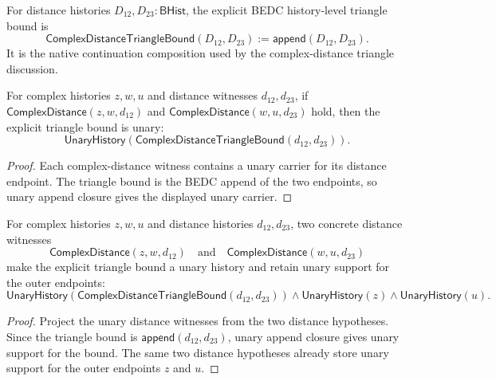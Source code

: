 \begin{definition}
\label{def:complex-distance-triangle-bound}
For distance histories $D_{12},D_{23}:\mathsf{BHist}$, the explicit BEDC
history-level triangle bound is
$$
\mathsf{ComplexDistanceTriangleBound}(D_{12},D_{23})
:=
\mathsf{append}(D_{12},D_{23}).
$$
It is the native continuation composition used by the complex-distance
triangle discussion.
\end{definition}

\begin{theorem}
\label{thm:complex-distance-triangle-bound-unary}
For complex histories $z,w,u$ and distance witnesses $d_{12},d_{23}$,
if $\mathsf{ComplexDistance}(z,w,d_{12})$ and
$\mathsf{ComplexDistance}(w,u,d_{23})$ hold, then the explicit triangle
bound is unary:
$$
\mathsf{UnaryHistory}
  (\mathsf{ComplexDistanceTriangleBound}(d_{12},d_{23})).
$$
\end{theorem}
\begin{proof}
Each complex-distance witness contains a unary carrier for its distance
endpoint. The triangle bound is the BEDC append of the two endpoints, so
unary append closure gives the displayed unary carrier.
\end{proof}

\begin{theorem}
\label{thm:complex-distance-triangle-bound-unary-of-distances}
For complex histories $z,w,u$ and distance histories $d_{12},d_{23}$,
two concrete distance witnesses
$$
\mathsf{ComplexDistance}(z,w,d_{12})
\quad\text{and}\quad
\mathsf{ComplexDistance}(w,u,d_{23})
$$
make the explicit triangle bound a unary history and retain unary support for
the outer endpoints:
$$
\mathsf{UnaryHistory}(\mathsf{ComplexDistanceTriangleBound}(d_{12},d_{23}))
\land \mathsf{UnaryHistory}(z)\land \mathsf{UnaryHistory}(u).
$$
\end{theorem}
\begin{proof}
Project the unary distance witnesses from the two distance hypotheses. Since
the triangle bound is $\mathsf{append}(d_{12},d_{23})$, unary append closure
gives unary support for the bound. The same two distance hypotheses already
store unary support for the outer endpoints $z$ and $u$.
\end{proof}

